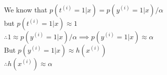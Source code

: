 \begin{answer}\\
We know that $p(t^{(i)}=1|x)=p(y^{(i)}=1|x)/\alpha$\\
but $p(t^{(i)}=1|x) \approx 1$\\
$\therefore 1 \approx p(y^{(i)}=1|x)/\alpha \implies p(y^{(i)}=1|x) \approx \alpha$\\
But $p(y^{(i)}=1|x) \approx h(x^{(i)})$\\
$\therefore h(x^{(i)}) \approx \alpha$ 
\end{answer}
